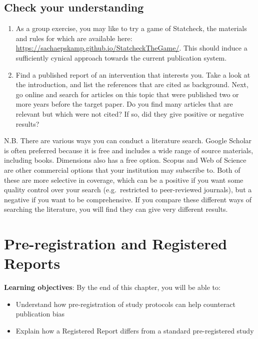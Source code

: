 \documentclass{krantz}
\begin{document}
\hypertarget{check-your-understanding-20}{%
\section{Check your understanding}\label{check-your-understanding-20}}

\begin{enumerate}
\def\labelenumi{\arabic{enumi}.}
\item
  As a group exercise, you may like to try a game of Statcheck, the materials and rules for which are available here: \url{https://sachaepskamp.github.io/StatcheckTheGame/}. This should induce a sufficiently cynical approach towards the current publication system.
\item
  Find a published report of an intervention that interests you. Take a look at the introduction, and list the references that are cited as background. Next, go online and search for articles on this topic that were published two or more years before the target paper. Do you find many articles that are relevant but which were not cited? If so, did they give positive or negative results?
\end{enumerate}

N.B. There are various ways you can conduct a literature search. Google Scholar is often preferred because it is free and includes a wide range of source materials, including books. Dimensions also has a free option. Scopus and Web of Science are other commercial options that your institution may subscribe to. Both of these are more selective in coverage, which can be a positive if you want some quality control over your search (e.g.~restricted to peer-reviewed journals), but a negative if you want to be comprehensive. If you compare these different ways of searching the literature, you will find they can give very different results.

\hypertarget{prereg}{%
\chapter{Pre-registration and Registered Reports}\label{prereg}}

\textbf{Learning objectives}: By the end of this chapter, you will be able to:

\begin{itemize}
\item
  Understand how pre-registration of study protocols can help counteract publication bias
\item
  Explain how a Registered Report differs from a standard pre-registered study
\end{itemize}
\end{document}

